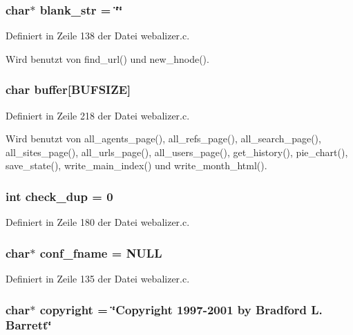 \subsubsection{\setlength{\rightskip}{0pt plus 5cm}char$\ast$ {\bf blank\_\-str} = \char`\"{}\char`\"{}}\label{webalizer_8c_8c3c3d8858d6430eea049c5989d2bf6d}




Definiert in Zeile 138 der Datei webalizer.c.

Wird benutzt von find\_\-url() und new\_\-hnode().
\subsubsection{\setlength{\rightskip}{0pt plus 5cm}char {\bf buffer}[BUFSIZE]}\label{webalizer_8c_09b4e72533ab279f7930a9a5e3ab050c}




Definiert in Zeile 218 der Datei webalizer.c.

Wird benutzt von all\_\-agents\_\-page(), all\_\-refs\_\-page(), all\_\-search\_\-page(), all\_\-sites\_\-page(), all\_\-urls\_\-page(), all\_\-users\_\-page(), get\_\-history(), pie\_\-chart(), save\_\-state(), write\_\-main\_\-index() und write\_\-month\_\-html().
\subsubsection{\setlength{\rightskip}{0pt plus 5cm}int {\bf check\_\-dup} = 0}\label{webalizer_8c_b1757477076fc2811cf714a92dc18d0f}




Definiert in Zeile 180 der Datei webalizer.c.
\subsubsection{\setlength{\rightskip}{0pt plus 5cm}char$\ast$ {\bf conf\_\-fname} = NULL}\label{webalizer_8c_cdbdc13e07422e1c556c3eda55c593c2}




Definiert in Zeile 135 der Datei webalizer.c.
\subsubsection{\setlength{\rightskip}{0pt plus 5cm}char$\ast$ {\bf copyright} = \char`\"{}Copyright 1997-2001 by Bradford L. Barrett\char`\"{}}\label{webalizer_8c_38852561a5fe1b90c4dae9d90b83a80a}





